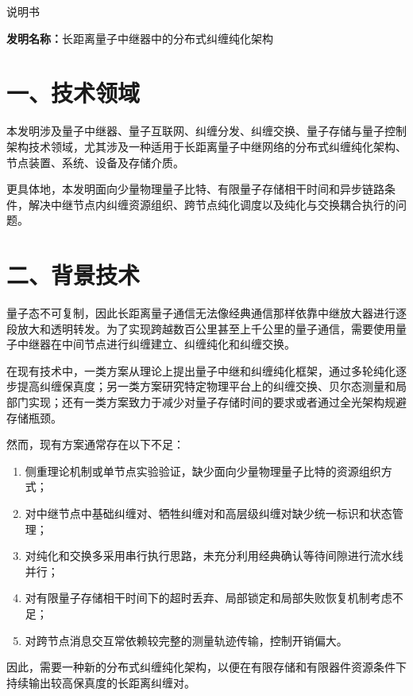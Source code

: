 \documentclass[12pt,a4paper]{article}
\begin{document}
\begin{center}
    {\Huge\heiti 说明书}
\end{center}

\vspace{1em}

\noindent\textbf{发明名称：}长距离量子中继器中的分布式纠缠纯化架构

\section*{一、技术领域}

本发明涉及量子中继器、量子互联网、纠缠分发、纠缠交换、量子存储与量子控制架构技术领域，尤其涉及一种适用于长距离量子中继网络的分布式纠缠纯化架构、节点装置、系统、设备及存储介质。

更具体地，本发明面向少量物理量子比特、有限量子存储相干时间和异步链路条件，解决中继节点内纠缠资源组织、跨节点纯化调度以及纯化与交换耦合执行的问题。

\section*{二、背景技术}

量子态不可复制，因此长距离量子通信无法像经典通信那样依靠中继放大器进行逐段放大和透明转发。为了实现跨越数百公里甚至上千公里的量子通信，需要使用量子中继器在中间节点进行纠缠建立、纠缠纯化和纠缠交换。

在现有技术中，一类方案从理论上提出量子中继和纠缠纯化框架，通过多轮纯化逐步提高纠缠保真度；另一类方案研究特定物理平台上的纠缠交换、贝尔态测量和局部门实现；还有一类方案致力于减少对量子存储时间的要求或者通过全光架构规避存储瓶颈。

然而，现有方案通常存在以下不足：
\begin{enumerate}[leftmargin=2em]
    \item 侧重理论机制或单节点实验验证，缺少面向少量物理量子比特的资源组织方式；
    \item 对中继节点中基础纠缠对、牺牲纠缠对和高层级纠缠对缺少统一标识和状态管理；
    \item 对纯化和交换多采用串行执行思路，未充分利用经典确认等待间隙进行流水线并行；
    \item 对有限量子存储相干时间下的超时丢弃、局部锁定和局部失败恢复机制考虑不足；
    \item 对跨节点消息交互常依赖较完整的测量轨迹传输，控制开销偏大。
\end{enumerate}

因此，需要一种新的分布式纠缠纯化架构，以便在有限存储和有限器件资源条件下持续输出较高保真度的长距离纠缠对。
\end{document}
